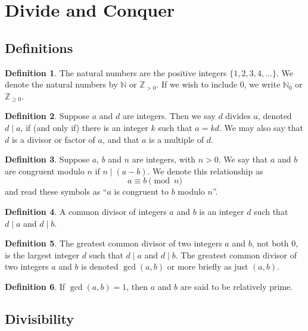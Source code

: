 \documentclass{article}
\theoremstyle{definition}
\newtheorem*{definition*}{Definition}
\begin{document}
\section{Divide and Conquer}
\subsection{Definitions}

\begin{definition*}
	The natural numbers are the positive integers $\{1, 2, 3, 4, \ldots\}$. We denote the natural numbers by $\mathbb{N}$ or $\mathbb{Z}_{>0}$. If we wish to include $0$, we write $\mathbb{N}_0$ or $\mathbb{Z}_{\geq 0}$.
\end{definition*}

\begin{definition*}
	Suppose $a$ and $d$ are integers. Then we say $d$ divides $a$, denoted $d \mid a$, if (and only if) there is an integer $k$ such that $a = kd$. We may also say that $d$ is a divisor or factor of $a$, and that $a$ is a multiple of $d$.
\end{definition*}

\begin{definition*}
	Suppose $a$, $b$ and $n$ are integers, with $n > 0$. We say that $a$ and $b$ are congruent modulo $n$ if $n \mid (a - b)$. We denote this relationship as
	\[a \equiv b \pmod{n}\]
	and read these symbols as ``$a$ is congruent to $b$ modulo $n$''.
\end{definition*}

\begin{definition*}
	A common divisor of integers $a$ and $b$ is an integer $d$ such that $d \mid a$ and $d \mid b$.
\end{definition*}

\begin{definition*}
	The greatest common divisor of two integers $a$ and $b$, not both $0$, is the largest integer $d$ such that $d \mid a$ and $d \mid b$. The greatest common divisor of two integers $a$ and $b$ is denoted $\gcd(a, b)$ or more briefly as just $(a, b)$.
\end{definition*}

\begin{definition*}
	If $\gcd(a, b) = 1$, then $a$ and $b$ are said to be relatively prime.
\end{definition*}

\subsection{Divisibility}
\end{document}
